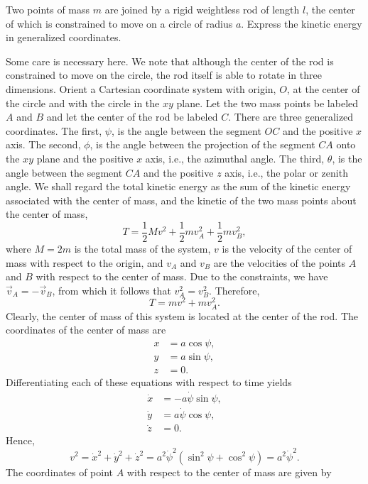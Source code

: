 \begin{questions}
\question Two points of mass $m$ are joined by a rigid weightless rod of length $l$, the center of which is constrained to move on a circle of radius $a$. Express the kinetic energy in generalized coordinates.
\begin{solution}
Some care is necessary here. We note that although the center of the rod is constrained to move on the circle, the rod itself is able to rotate in three dimensions. Orient a Cartesian coordinate system with origin, $O$, at the center of the circle and with the circle in the $xy$ plane. Let the two mass points be labeled $A$ and $B$ and let the center of the rod be labeled $C$. There are three generalized coordinates. The first, $\psi$, is the angle between the segment $OC$ and the positive $x$ axis. The second, $\phi$, is the angle between the projection of the segment $CA$ onto the $xy$ plane and the positive $x$ axis, i.e., the azimuthal angle. The third, $\theta$, is the angle between the segment $CA$ and the positive $z$ axis, i.e., the polar or zenith angle. We shall regard the total kinetic energy as the sum of the kinetic energy associated with the center of mass, and the kinetic of the two mass points about the center of mass,
\[
T = \frac{1}{2} M v^2 + \frac{1}{2} m v_A^2 + \frac{1}{2} m v_B^2,
\]
where $M = 2m$ is the total mass of the system, $v$ is the velocity of the center of mass with respect to the origin, and $v_A$ and $v_B$ are the velocities of the points $A$ and $B$ with respect to the center of mass. Due to the constraints, we have $\vec{v}_A = -\vec{v}_B$, from which it follows that $v_A^2 = v_B^2$. Therefore,
\[
T = m v^2 + m v_A^2.
\]
Clearly, the center of mass of this system is located at the center of the rod. The coordinates of the center of mass are
\begin{align*}
x &= a \cos \psi, \\
y &= a \sin \psi, \\
z &= 0.
\end{align*}
Differentiating each of these equations with respect to time yields
\begin{align*}
\dot{x} &= -a \dot{\psi} \sin \psi, \\
\dot{y} &= a \dot{\psi} \cos \psi, \\
\dot{z} &= 0.
\end{align*}
Hence,
\[
v^2 = \dot{x}^2 + \dot{y}^2 + \dot{z}^2 = a^2 \dot{\psi}^2 ( \sin^2 \psi + \cos^2 \psi ) = a^2 \dot{\psi}^2.
\]
The coordinates of point $A$ with respect to the center of mass are given by
\begin{align*}

\end{align*}
\end{solution}
\end{questions}
